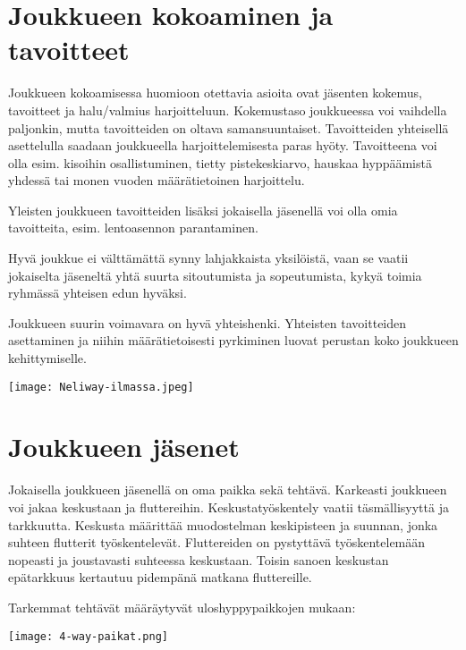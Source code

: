 \section{ Joukkueen kokoaminen ja tavoitteet }
\label{4-way-joukkuehyppaaminen-joukkueen-kokoaminen-ja-tavoitteet}


Joukkueen kokoamisessa huomioon otettavia asioita ovat jäsenten kokemus, tavoitteet ja halu/valmius harjoitteluun. Kokemustaso joukkueessa voi vaihdella paljonkin, mutta tavoitteiden on oltava samansuuntaiset. Tavoitteiden yhteisellä asettelulla saadaan joukkueella harjoittelemisesta paras hyöty. Tavoitteena voi olla esim. kisoihin osallistuminen, tietty pistekeskiarvo, hauskaa hyppäämistä yhdessä tai monen vuoden määrätietoinen harjoittelu. 


Yleisten joukkueen tavoitteiden lisäksi jokaisella jäsenellä voi olla omia tavoitteita, esim. lentoasennon parantaminen. 


Hyvä joukkue ei välttämättä synny lahjakkaista yksilöistä, vaan se vaatii jokaiselta jäseneltä yhtä suurta sitoutumista ja sopeutumista, kykyä toimia ryhmässä yhteisen edun hyväksi. 


Joukkueen suurin voimavara on hyvä yhteishenki. Yhteisten tavoitteiden asettaminen ja niihin määrätietoisesti pyrkiminen luovat perustan koko joukkueen kehittymiselle. 


\begin{Figure}\centering\texttt{[image: Neliway-ilmassa.jpeg]}\end{Figure} 

\section{ Joukkueen jäsenet }
\label{4-way-joukkuehyppaaminen-joukkueen-jasenet}


Jokaisella joukkueen jäsenellä on oma paikka sekä tehtävä. Karkeasti joukkueen voi jakaa keskustaan ja fluttereihin. Keskustatyöskentely vaatii täsmällisyyttä ja tarkkuutta. Keskusta määrittää muodostelman keskipisteen ja suunnan, jonka suhteen flutterit työskentelevät. Fluttereiden on pystyttävä työskentelemään nopeasti ja joustavasti suhteessa keskustaan. Toisin sanoen keskustan epätarkkuus kertautuu pidempänä matkana fluttereille. 


Tarkemmat tehtävät määräytyvät uloshyppypaikkojen mukaan: 


\begin{Figure}\centering\texttt{[image: 4-way-paikat.png]}\end{Figure} 



